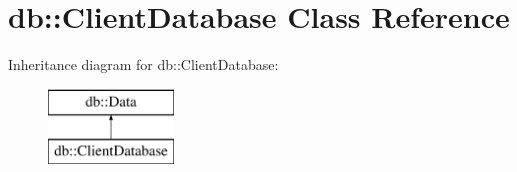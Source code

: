 \hypertarget{classdb_1_1_client_database}{}\section{db\+:\+:Client\+Database Class Reference}
\label{classdb_1_1_client_database}
Inheritance diagram for db\+:\+:Client\+Database\+:\begin{figure}[H]
\begin{center}
\leavevmode
\includegraphics[height=2.000000cm]{classdb_1_1_client_database}
\end{center}
\end{figure}
